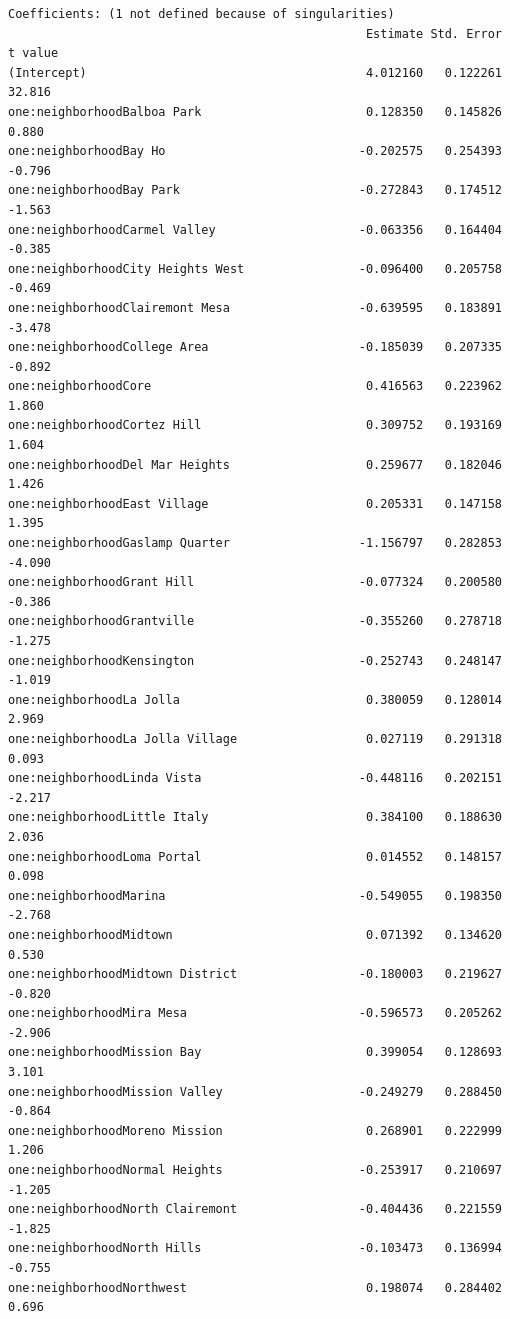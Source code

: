 \documentclass[
  letterpaper,
  DIV=11,
  numbers=noendperiod,
  oneside]{scrreprt}
\begin{document}
\begin{verbatim}
Coefficients: (1 not defined because of singularities)
                                                  Estimate Std. Error t value
(Intercept)                                       4.012160   0.122261  32.816
one:neighborhoodBalboa Park                       0.128350   0.145826   0.880
one:neighborhoodBay Ho                           -0.202575   0.254393  -0.796
one:neighborhoodBay Park                         -0.272843   0.174512  -1.563
one:neighborhoodCarmel Valley                    -0.063356   0.164404  -0.385
one:neighborhoodCity Heights West                -0.096400   0.205758  -0.469
one:neighborhoodClairemont Mesa                  -0.639595   0.183891  -3.478
one:neighborhoodCollege Area                     -0.185039   0.207335  -0.892
one:neighborhoodCore                              0.416563   0.223962   1.860
one:neighborhoodCortez Hill                       0.309752   0.193169   1.604
one:neighborhoodDel Mar Heights                   0.259677   0.182046   1.426
one:neighborhoodEast Village                      0.205331   0.147158   1.395
one:neighborhoodGaslamp Quarter                  -1.156797   0.282853  -4.090
one:neighborhoodGrant Hill                       -0.077324   0.200580  -0.386
one:neighborhoodGrantville                       -0.355260   0.278718  -1.275
one:neighborhoodKensington                       -0.252743   0.248147  -1.019
one:neighborhoodLa Jolla                          0.380059   0.128014   2.969
one:neighborhoodLa Jolla Village                  0.027119   0.291318   0.093
one:neighborhoodLinda Vista                      -0.448116   0.202151  -2.217
one:neighborhoodLittle Italy                      0.384100   0.188630   2.036
one:neighborhoodLoma Portal                       0.014552   0.148157   0.098
one:neighborhoodMarina                           -0.549055   0.198350  -2.768
one:neighborhoodMidtown                           0.071392   0.134620   0.530
one:neighborhoodMidtown District                 -0.180003   0.219627  -0.820
one:neighborhoodMira Mesa                        -0.596573   0.205262  -2.906
one:neighborhoodMission Bay                       0.399054   0.128693   3.101
one:neighborhoodMission Valley                   -0.249279   0.288450  -0.864
one:neighborhoodMoreno Mission                    0.268901   0.222999   1.206
one:neighborhoodNormal Heights                   -0.253917   0.210697  -1.205
one:neighborhoodNorth Clairemont                 -0.404436   0.221559  -1.825
one:neighborhoodNorth Hills                      -0.103473   0.136994  -0.755
one:neighborhoodNorthwest                         0.198074   0.284402   0.696

\end{verbatim}
\end{document}

